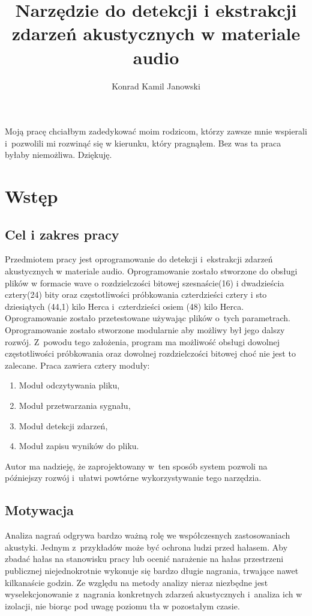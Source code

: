 \documentclass[eng,printmode]{mgr}
\title{Narzędzie do detekcji i ekstrakcji zdarzeń akustycznych w materiale audio}
\author{Konrad Kamil Janowski}
\begin{document}

\maketitle %
\dedication{6cm}{Moją pracę chciałbym zadedykować moim rodzicom, którzy zawsze mnie wspierali i~pozwolili mi rozwinąć się w kierunku, który pragnąłem. Bez was ta praca byłaby niemożliwa. Dziękuję.}

\tableofcontents %

\chapter{Wstęp}
\section{Cel i zakres pracy}
Przedmiotem pracy jest oprogramowanie do detekcji i~ekstrakcji zdarzeń akustycznych w materiale audio. Oprogramowanie zostało stworzone do obsługi plików w formacie wave o rozdzielczości bitowej szesnaście(16) i dwadzieścia cztery(24) bity oraz częstotliwości próbkowania czterdzieści cztery i sto dziesiątych (44,1) kilo Herca i~czterdzieści osiem (48) kilo Herca. Oprogramowanie zostało przetestowane używając plików o~tych parametrach. Oprogramowanie zostało stworzone modularnie aby możliwy był jego dalszy rozwój. Z~powodu tego założenia, program ma możliwość obsługi dowolnej częstotliwości próbkowania oraz dowolnej rozdzielczości bitowej choć nie jest to zalecane. Praca zawiera cztery moduły:
\begin{enumerate}
\item Moduł odczytywania pliku,
\item Moduł przetwarzania sygnału,
\item Moduł detekcji zdarzeń,
\item Moduł zapisu wyników do pliku.
\end{enumerate}
Autor ma \cite{Python_data_structures} nadzieję, że zaprojektowany w~ten sposób system pozwoli na późniejszy rozwój i~ułatwi powtórne wykorzystywanie tego narzędzia.
\section{Motywacja}
Analiza nagrań odgrywa bardzo ważną rolę we współczesnych zastosowaniach akustyki. Jednym z~przykładów może być ochrona ludzi przed hałasem. Aby zbadać hałas na stanowisku pracy lub ocenić narażenie na hałas przestrzeni publicznej niejednokrotnie wykonuje się bardzo długie nagrania, trwające nawet kilkanaście godzin. Ze względu na metody analizy nieraz niezbędne jest wyselekcjonowanie z~nagrania konkretnych zdarzeń akustycznych i~analiza ich w izolacji, nie biorąc pod uwagę poziomu tła w pozostałym czasie. 
\end{document}
